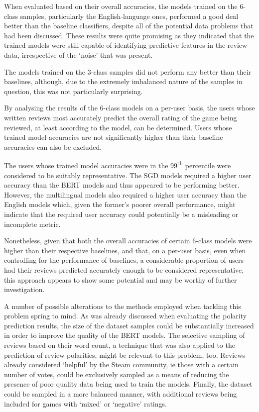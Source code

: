 When evaluated based on their overall accuracies, the models trained on the 6-class samples, particularly the English-language ones, performed a good deal better than the baseline classifiers, despite all of the potential data problems that had been discussed. These results were quite promising as they indicated that the trained models were still capable of identifying predictive features in the review data, irrespective of the `noise' that was present.

The models trained on the 3-class samples did not perform any better than their baselines, although, due to the extremely imbalanced nature of the samples in question, this was not particularly surprising.

By analysing the results of the 6-class models on a per-user basis, the users whose written reviews most accurately predict the overall rating of the game being reviewed, at least according to the model, can be determined. Users whose trained model accuracies are not significantly higher than their baseline accuracies can also be excluded.

The users whose trained model accuracies were in the 99\textsuperscript{th} percentile were considered to be suitably representative. The SGD models required a higher user accuracy than the BERT models and thus appeared to be performing better. However, the multilingual models also required a higher user accuracy than the English models which, given the former's poorer overall performance, might indicate that the required user accuracy could potentially be a misleading or incomplete metric.

Nonetheless, given that both the overall accuracies of certain 6-class models were higher than their respective baselines, and that, on a per-user basis, even when controlling for the performance of baselines, a considerable proportion of users had their reviews predicted accurately enough to be considered representative, this approach appears to show some potential and may be worthy of further investigation.

A number of possible alterations to the methods employed when tackling this problem spring to mind. As was already discussed when evaluating the polarity prediction results, the size of the dataset samples could be substantially increased in order to improve the quality of the BERT models. The selective sampling of reviews based on their word count, a technique that was also applied to the prediction of review polarities, might be relevant to this problem, too. Reviews already considered `helpful' by the Steam community, ie those with a certain number of votes, could be exclusively sampled as a means of reducing the presence of poor quality data being used to train the models. Finally, the dataset could be sampled in a more balanced manner, with additional reviews being included for games with `mixed' or `negative' ratings.

